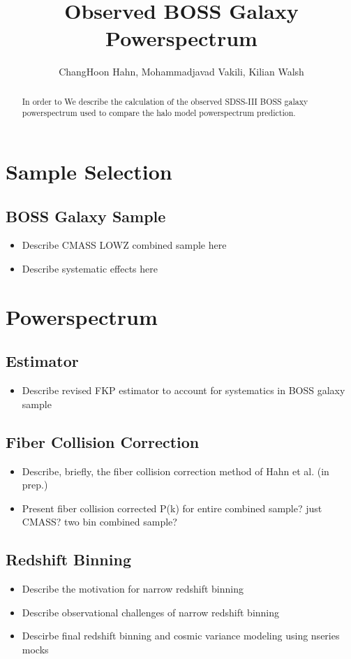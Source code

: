 \documentclass{article}
\begin{document}
\title{Observed BOSS Galaxy Powerspectrum}
\author{ChangHoon Hahn, Mohammadjavad Vakili, Kilian Walsh}

\begin{abstract}
In order to We describe the calculation of the observed SDSS-III BOSS galaxy powerspectrum used to compare the halo model powerspectrum prediction. 
\end{abstract}

\section{Sample Selection}
\subsection{BOSS Galaxy Sample} \label{sec:cmasslowz}
\begin{itemize}
\item Describe CMASS LOWZ combined sample here 
\item Describe systematic effects here 
\end{itemize}

\section{Powerspectrum}
\subsection{Estimator} 
\begin{itemize}
\item Describe revised FKP estimator to account for systematics in BOSS galaxy sample 
\end{itemize}

\subsection{Fiber Collision Correction}
\begin{itemize}
\item Describe, briefly, the fiber collision correction method of Hahn et al. (in prep.) 
\item Present fiber collision corrected P(k) for entire combined sample? just CMASS? two bin combined sample? 
\end{itemize}

\subsection{Redshift Binning} 
\begin{itemize}
\item Describe the motivation for narrow redshift binning 
\item Describe observational challenges of narrow redshift binning
\item Descirbe final redshift binning and cosmic variance modeling using nseries mocks 
\end{itemize}
\end{document}
